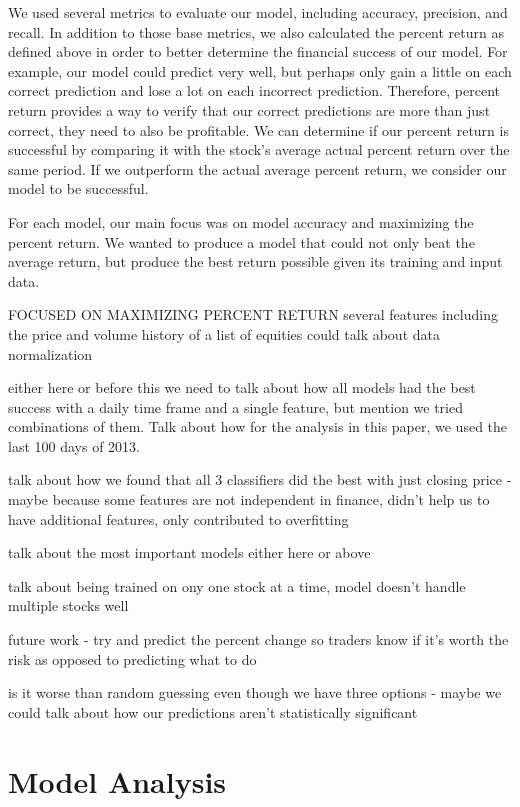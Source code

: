\documentclass{article}
\begin{document}
We used several metrics to evaluate our model, including accuracy, precision, and recall. In addition to those base metrics, we also calculated the percent return as defined above in order to better determine the financial success of our model. For example, our model could predict very well, but perhaps only gain a little on each correct prediction and lose a lot on each incorrect prediction. Therefore, percent return provides a way to verify that our correct predictions are more than just correct, they need to also be profitable. We can determine if our percent return is successful by comparing it with the stock's average actual percent return over the same period. If we outperform the actual average percent return, we consider our model to be successful.

For each model, our main focus was on model accuracy and maximizing the percent return. We wanted to produce a model that could not only beat the average return, but produce the best return possible given its training and input data.

FOCUSED ON MAXIMIZING PERCENT RETURN
several features including the price and volume history of a list of equities
could talk about data normalization

either here or before this we need to talk about how all models had the best success with a daily time frame and a single feature, but mention we tried combinations of them. Talk about how for the analysis in this paper, we used the last 100 days of 2013.

talk about how we found that all 3 classifiers did the best with just closing price - maybe because some features are not independent in finance, didn't help us to have additional features, only contributed to overfitting

talk about the most important models either here or above

talk about being trained on ony one stock at a time, model doesn't handle multiple stocks well

future work - try and predict the percent change so traders know if it's worth the risk as opposed to predicting what to do

is it worse than random guessing even though we have three options - maybe we could talk about how our predictions aren't statistically significant

\section{Model Analysis}
\end{document}
